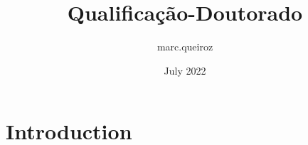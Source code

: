 \documentclass{article}
\title{Qualificação-Doutorado}
\author{marc.queiroz }
\date{July 2022}
\begin{document}
\maketitle

\section{Introduction}
\end{document}
